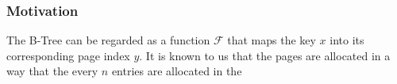 \subsubsection{Motivation}

The B-Tree can be regarded as a function $\mathcal{F}$ that maps the key $x$ into its corresponding page index $y$. It is known to us that the pages are allocated in a way that the every $n$ entries are allocated in the